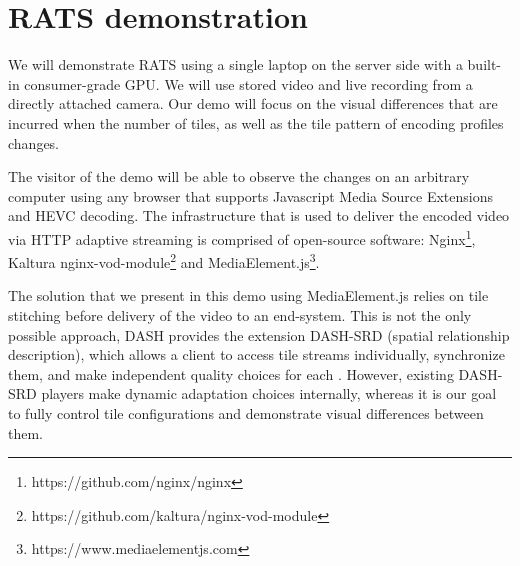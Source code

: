\section{RATS demonstration} \label{infra}

We will demonstrate RATS using a single laptop on the server side with a built-in consumer-grade GPU. We will use stored video and live recording from a directly attached camera. Our demo will focus on the visual differences that are incurred when the number of tiles, as well as the tile pattern of encoding profiles changes.

The visitor of the demo will be able to observe the changes on an arbitrary computer using any browser that supports Javascript Media Source Extensions and HEVC decoding.
The infrastructure that is used to deliver the encoded video via HTTP adaptive streaming is comprised of open-source software: Nginx\footnote{https://github.com/nginx/nginx}, Kaltura nginx-vod-module\footnote{https://github.com/kaltura/nginx-vod-module} and MediaElement.js\footnote{https://www.mediaelementjs.com}.

The solution that we present in this demo using MediaElement.js relies on tile stitching before delivery of the video to an end-system.	
This is not the only possible approach, DASH provides the extension DASH-SRD (spatial relationship description), which allows a client to access tile streams individually, synchronize them, and make independent quality choices for each \cite{niamut2016}.
However, existing DASH-SRD players make dynamic adaptation choices internally, whereas it is our goal to fully control tile configurations and demonstrate visual differences between them.



